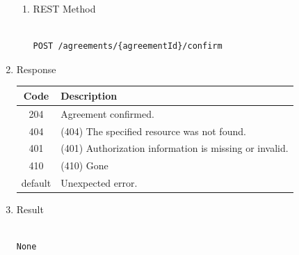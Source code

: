 \begin{enumerate}
\begin{enumerate}
\item REST Method

\begin{tcolorbox}[boxrule=0pt, frame empty]
\begin{verbatim} 

POST /agreements/{agreementId}/confirm

\end{verbatim}
\end{tcolorbox}

\end{enumerate}

\item Response

\begin{center}
\begin{tabular}{|c|l|} 
\hline
\rowcolor{lightgray}	Code 		& 	Description \\
\hline
204	 		&	Agreement confirmed. \\
\hline
404			&	(404) The specified resource was not found. \\
\hline
401			&	(401) Authorization information is missing or invalid. \\
\hline
410			&	(410) Gone \\
\hline
default		&	Unexpected error. \\
\hline
\end{tabular}
\end{center}

\item Result

\begin{tcolorbox}[boxrule=0pt, frame empty]
\begin{verbatim}

None

\end{verbatim}
\end{tcolorbox}



\end{enumerate}
